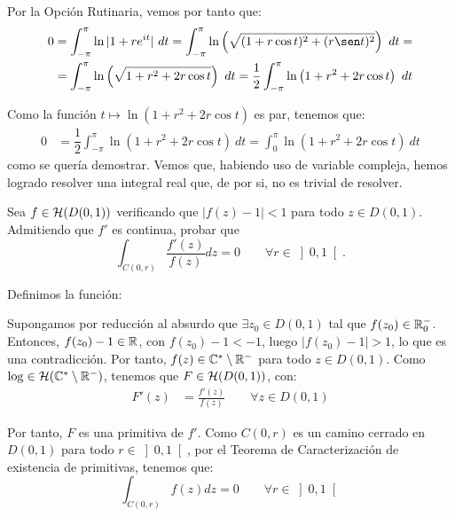 \begin{ejercicio}
    Por la Opción Rutinaria, vemos por tanto que:
    \begin{align*}
        0&= \int_{-\pi}^{\pi} \ln|1+re^{it}|\ dt
        = \int_{-\pi}^{\pi} \ln\left(\sqrt{(1+r\cos t)^2+(r\sen t)^2}\right)\ dt
        =\\&= \int_{-\pi}^{\pi} \ln\left(\sqrt{1+r^2+2r\cos t}\right)\ dt
        = \dfrac{1}{2}\int_{-\pi}^{\pi} \ln\left(1+r^2+2r\cos t\right)\ dt
    \end{align*}

    Como la función $t\mapsto \ln\left(1+r^2+2r\cos t\right)$ es par, tenemos que:
    \begin{align*}
        0&= \dfrac{1}{2}\int_{-\pi}^{\pi} \ln\left(1+r^2+2r\cos t\right)\ dt
        = \int_{0}^{\pi} \ln\left(1+r^2+2r\cos t\right)\ dt
    \end{align*}
    como se quería demostrar. Vemos que, habiendo uso de variable compleja, hemos logrado resolver una integral real que, de por si, no es trivial de resolver.
\end{ejercicio}

\begin{ejercicio}
    Sea $f \in \mathcal{H}(D(0,1))$ verificando que $|f(z)-1| < 1$ para todo $z \in D(0,1)$. Admitiendo que $f'$ es continua, probar que
    \[
        \int_{C(0,r)} \frac{f'(z)}{f(z)}dz = 0\qquad \forall r \in \left]0,1\right[.
    \]

    Definimos la función:

    Supongamos por reducción al absurdo que $\exists z_0 \in D(0,1)$ tal que $f(z_0)\in \mathbb{R}_0^-$. Entonces, $f(z_0)-1\in \mathbb{R}$, con $f(z_0)-1<-1$, luego $|f(z_0)-1|>1$, lo que es una contradicción. Por tanto, $f(z)\in \mathbb{C}^\ast\setminus \mathbb{R}^-$ para todo $z \in D(0,1)$. Como $\log\in \mathcal{H}(\mathbb{C}^\ast\setminus \mathbb{R}^-)$, tenemos que $F\in \mathcal{H}(D(0,1))$, con:
    \begin{align*}
        F'(z) &= \frac{f'(z)}{f(z)}\qquad \forall z \in D(0,1)
    \end{align*}

    Por tanto, $F$ es una primitiva de $f'$. Como $C(0,r)$ es un camino cerrado en $D(0,1)$ para todo $r \in \left]0,1\right[$, por el Teorema de Caracterización de existencia de primitivas, tenemos que:
    \begin{equation*}
        \int_{C(0,r)} f(z)dz = 0\qquad \forall r \in \left]0,1\right[
    \end{equation*}
\end{ejercicio}


